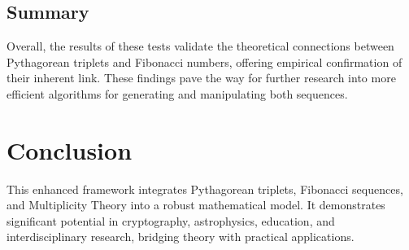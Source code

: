 \documentclass{article}
\theoremstyle{plain}
\begin{document}
\subsection{Summary}
Overall, the results of these tests validate the theoretical connections between Pythagorean triplets and Fibonacci numbers, offering empirical confirmation of their inherent link. These findings pave the way for further research into more efficient algorithms for generating and manipulating both sequences.

\section{Conclusion}
This enhanced framework integrates Pythagorean triplets, Fibonacci sequences, and Multiplicity Theory into a robust mathematical model. It demonstrates significant potential in cryptography, astrophysics, education, and interdisciplinary research, bridging theory with practical applications.

\nocite{*}


\end{document}
